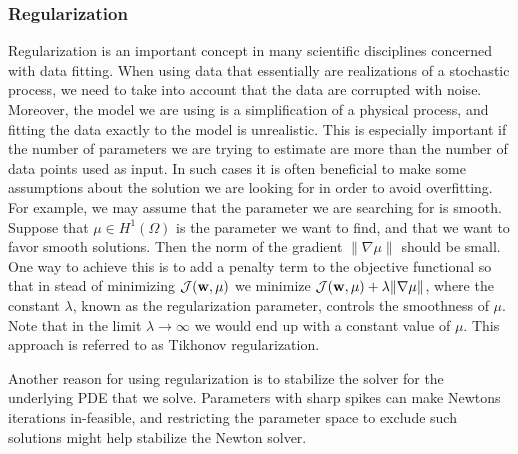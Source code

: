 \subsubsection{Regularization}
\label{sec:intro_regularization}
Regularization is an important concept in many scientific disciplines
concerned with data fitting. When using data that essentially are
realizations of a stochastic process, we need to take into account
that the data are corrupted with noise. Moreover, the model we are using
is a simplification of a physical process, and fitting the
data exactly to the model is unrealistic. This is especially
important if the number of parameters we are trying to estimate are
more than the number of data points used as input. In such cases it is often
beneficial to make some assumptions about the solution we are looking
for in order to avoid overfitting. For example, we may assume that the
parameter we are searching for is smooth. Suppose that $\mu \in
H^1(\Omega)$ is the parameter we want to find, and that we want to
favor smooth solutions. Then the norm of the gradient $\| \nabla \mu
\|$ should be small. One way to achieve this is to add a penalty term
to the objective functional so that in stead of minimizing
$\mathcal{J}(\mathbf{w}, \mu)$ we minimize $\mathcal{J}(\mathbf{w}, \mu) +
\lambda \| \nabla \mu\|$, where the constant $\lambda$, known as the
regularization parameter, controls the smoothness of $\mu$.
Note that in the limit $\lambda \rightarrow \infty$ we would end up
with a constant value of $\mu$. This approach is referred to as Tikhonov
regularization.

Another reason for using regularization is to stabilize the solver for
the underlying PDE that we solve. Parameters with sharp spikes
can make Newtons iterations in-feasible, and restricting the
parameter space to exclude such solutions might help stabilize the
Newton solver. 






